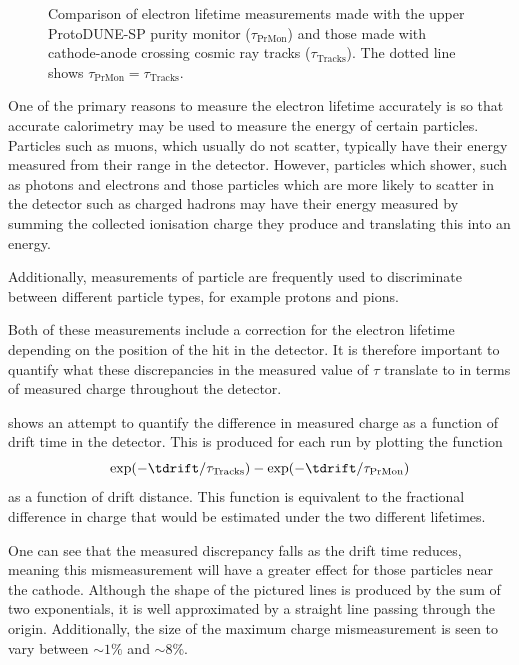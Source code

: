 \begin{figure}[h]
	\begin{adjustbox}{max totalsize=.6\linewidth, center}
		
	\end{adjustbox}
	\caption[Comparison of electron lifetime measurements made with purity monitors and cosmic ray tracks]{Comparison of electron lifetime measurements made with the upper ProtoDUNE-SP purity monitor ($\tau_{\text{PrMon}}$) and those made with cathode-anode crossing cosmic ray tracks ($\tau_{\text{Tracks}}$). The dotted line shows $\tau_{\text{PrMon}} = \tau_{\text{Tracks}}$.}
	\label{fig:lifetimeComp}
\end{figure}

One of the primary reasons to measure the electron lifetime accurately is so that accurate calorimetry may be used to measure the energy of certain particles.
Particles such as muons, which usually do not scatter, typically have their energy measured from their range in the detector.
However, particles which shower, such as photons and electrons and those particles which are more likely to scatter in the detector such as charged hadrons may have their energy measured by summing the collected ionisation charge they produce and translating this into an energy.

Additionally, measurements of particle \dedx are frequently used to discriminate between different particle types, for example protons and pions.

Both of these measurements include a correction for the electron lifetime depending on the position of the hit in the detector.
It is therefore important to quantify what these discrepancies in the measured value of $\tau$ translate to in terms of measured charge throughout the detector.

 shows an attempt to quantify the difference in measured charge as a function of drift time in the detector. 
This is produced for each run by plotting the function
\begin{equation}
	\exp(-\tdrift / \tau_{\text{Tracks}}) - \exp(-\tdrift / \tau_{\text{PrMon}})
\end{equation}
as a function of drift distance.
This function is equivalent to the fractional difference in charge that would be estimated under the two different lifetimes.

One can see that the measured discrepancy falls as the drift time reduces, meaning this mismeasurement will have a greater effect for those particles near the cathode. 
Although the shape of the pictured lines is produced by the sum of two exponentials, it is well approximated by a straight line passing through the origin.
Additionally, the size of the maximum charge mismeasurement is seen to vary between $\sim 1\%$ and $\sim 8\%$.

